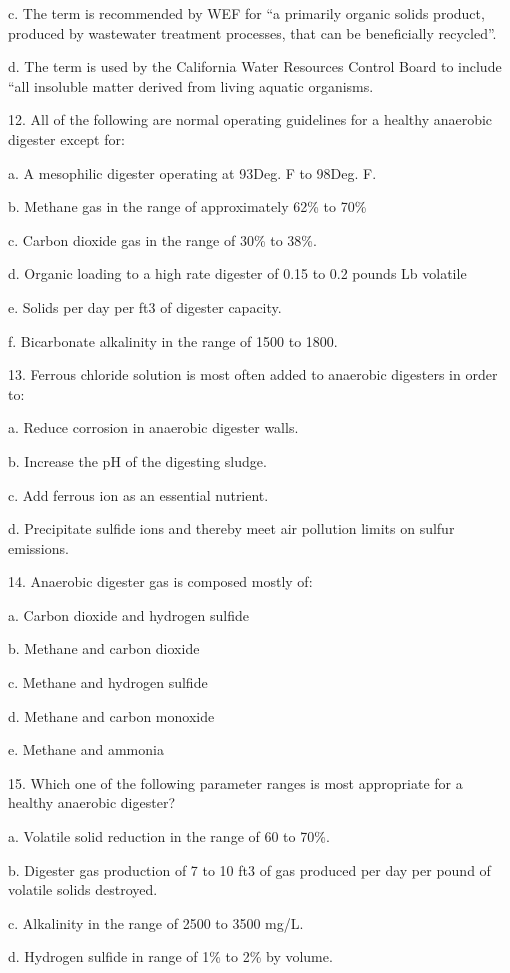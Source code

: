\documentclass{article}
\begin{document}
c. The term is recommended by WEF for “a primarily organic solids product, produced by wastewater treatment processes, that can be beneficially recycled”. 

d. The term is used by the California Water Resources Control Board to include “all insoluble matter derived from living aquatic organisms. 


12. All of the following are normal operating guidelines for a healthy anaerobic digester except for: 

a. A mesophilic digester operating at 93Deg. F to 98Deg. F. 

b. Methane gas in the range of approximately 62\% to 70\% 

c. Carbon dioxide gas in the range of 30\% to 38\%. 

d. Organic loading to a high rate digester of 0.15 to 0.2 pounds Lb volatile 

e. Solids per day per ft3 of digester capacity. 

f. Bicarbonate alkalinity in the range of 1500 to 1800. 


13. Ferrous chloride solution is most often added to anaerobic digesters in order to: 

a. Reduce corrosion in anaerobic digester walls. 

b. Increase the pH of the digesting sludge. 

c. Add ferrous ion as an essential nutrient. 

d. Precipitate sulfide ions and thereby meet air pollution limits on sulfur emissions. 


14. Anaerobic digester gas is composed mostly of: 

a. Carbon dioxide and hydrogen sulfide 

b. Methane and carbon dioxide 

c. Methane and hydrogen sulfide 

d. Methane and carbon monoxide 

e. Methane and ammonia 


15. Which one of the following parameter ranges is most appropriate for a healthy anaerobic digester?

a. Volatile solid reduction in the range of 60 to 70\%. 

b. Digester gas production of 7 to 10 ft3 of gas produced per day per pound of volatile solids destroyed. 

c. Alkalinity in the range of 2500 to 3500 mg/L. 

d. Hydrogen sulfide in range of 1\% to 2\% by volume. 
\end{document}
